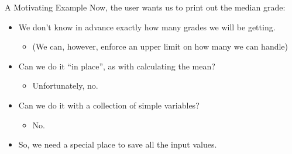 \documentclass[graphics]{beamer}
\begin{document}
\begin{frame}{A Motivating Example}
    Now, the user wants us to print out the median grade:
    \begin{itemize}
        \item We don’t know in advance exactly how many grades we will be getting.
        \begin{itemize}
            \item (We can, however, enforce an upper limit on how many we can handle)
        \end{itemize}
        \item Can we do it ``in place'', as with calculating the mean?
        \begin{itemize}
            \item Unfortunately, no.
        \end{itemize}
        \item Can we do it with a collection of simple variables?
        \begin{itemize}
            \item No.
        \end{itemize}
        \item So, we need a special place to save all the input values.
    \end{itemize}
\end{frame}
\end{document}
